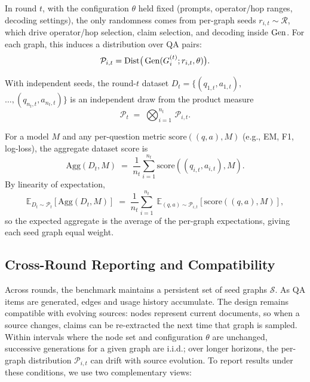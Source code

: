 In round $t$, with the configuration $\theta$ held fixed (prompts, operator/hop ranges, decoding settings), the only randomness comes from per-graph seeds $r_{i,t}\!\sim\!\mathcal{R}$, which drive operator/hop selection, claim selection, and decoding inside $\operatorname{Gen}$. For each graph, this induces a distribution over QA pairs:
\begin{equation}
    \mathcal{P}_{i,t} = \operatorname{Dist}\!\big(\operatorname{Gen}(G_i^{(t)}; r_{i,t}, \theta)\big).
\end{equation}

With independent seeds, the round-$t$ dataset
$D_t=\{(q_{1,t},a_{1,t}),$ $\ldots,(q_{n_t,t},a_{n_t,t})\}$
is an independent draw from the product measure
\begin{equation}
    \mathcal{P}_t \;=\; \bigotimes_{i=1}^{n_t}\, \mathcal{P}_{i,t}.
\end{equation}

For a model $M$ and any per-question metric $\text{score}((q,a),M)$ (e.g., EM, F1, log-loss), the aggregate dataset score is
\begin{equation}
    \text{Agg}(D_t,M) \;=\; \frac{1}{n_t}\sum_{i=1}^{n_t}\text{score}((q_{i,t},a_{i,t}),M).
\end{equation}
By linearity of expectation,
\begin{equation}
    \mathbb{E}_{D_t\sim\mathcal{P}_t}\!\left[\text{Agg}(D_t,M)\right]
    \;=\; \frac{1}{n_t}\sum_{i=1}^{n_t}\;
    \mathbb{E}_{(q,a)\sim\mathcal{P}_{i,t}}\!\left[\text{score}((q,a),M)\right],
\end{equation}
so the expected aggregate is the average of the per-graph expectations, giving each seed graph equal weight.



\subsection{Cross-Round Reporting and Compatibility}

Across rounds, the benchmark maintains a persistent set of seed graphs $\mathcal{S}$. As QA items are generated, edges and usage history accumulate. The design remains compatible with evolving sources: nodes represent current documents, so when a source changes, claims can be re-extracted the next time that graph is sampled. Within intervals where the node set and configuration $\theta$ are unchanged, successive generations for a given graph are i.i.d.; over longer horizons, the per-graph distribution $\mathcal{P}_{i,t}$ can drift with source evolution. To report results under these conditions, we use two complementary views:

